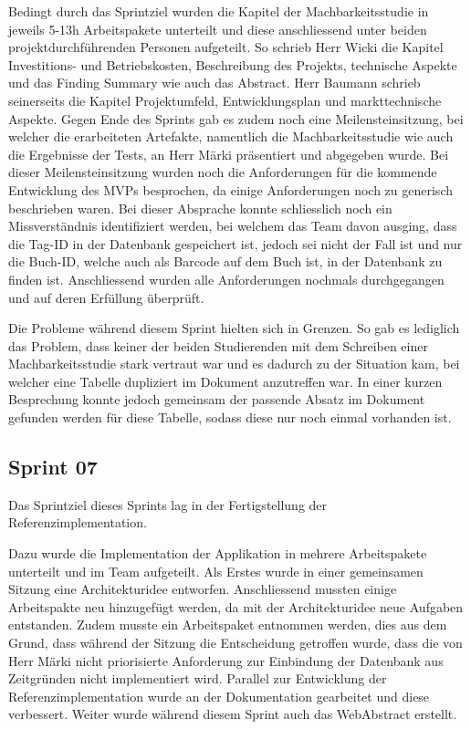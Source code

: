 Bedingt durch das Sprintziel wurden die Kapitel der Machbarkeitsstudie in jeweils 5-13h Arbeitspakete unterteilt und diese anschliessend unter beiden projektdurchführenden Personen aufgeteilt. So schrieb Herr Wicki die Kapitel Investitions- und Betriebskosten, Beschreibung des Projekts, technische Aspekte und das Finding Summary wie auch das Abstract. Herr Baumann schrieb seinerseits die Kapitel Projektumfeld, Entwicklungsplan und markttechnische Aspekte.
Gegen Ende des Sprints gab es zudem noch eine Meilensteinsitzung, bei welcher die erarbeiteten Artefakte, namentlich die Machbarkeitsstudie wie auch die Ergebnisse der Tests, an Herr Märki präsentiert und abgegeben wurde. Bei dieser Meilensteinsitzung wurden noch die Anforderungen für die kommende Entwicklung des MVPs besprochen, da einige Anforderungen noch zu generisch beschrieben waren. Bei dieser Absprache konnte schliesslich noch ein Missverständnis identifiziert werden, bei welchem das Team davon ausging, dass die Tag-ID in der Datenbank gespeichert ist, jedoch sei nicht der Fall ist und nur die Buch-ID, welche auch als Barcode auf dem Buch ist, in der Datenbank zu finden ist. Anschliessend wurden alle Anforderungen nochmals durchgegangen und auf deren Erfüllung überprüft.

Die Probleme während diesem Sprint hielten sich in Grenzen. So gab es lediglich das Problem, dass keiner der beiden Studierenden mit dem Schreiben einer Machbarkeitsstudie stark vertraut war und es dadurch zu der Situation kam, bei welcher eine Tabelle dupliziert im Dokument anzutreffen war. In einer kurzen Besprechung konnte jedoch gemeinsam der passende Absatz im Dokument gefunden werden für diese Tabelle, sodass diese nur noch einmal vorhanden ist.

\subsection{Sprint 07}
Das Sprintziel dieses Sprints lag in der Fertigstellung der Referenzimplementation.

 Dazu wurde die Implementation der Applikation in mehrere Arbeitspakete unterteilt und im Team aufgeteilt. Als Erstes wurde in einer gemeinsamen Sitzung eine Architekturidee entworfen. Anschliessend mussten einige Arbeitspakte neu hinzugefügt werden, da mit der Architekturidee neue Aufgaben entstanden. Zudem musste ein Arbeitspaket entnommen werden, dies aus dem Grund, dass während der Sitzung die Entscheidung getroffen wurde, dass die von Herr Märki nicht priorisierte Anforderung zur Einbindung der Datenbank aus Zeitgründen nicht implementiert wird. Parallel zur Entwicklung der Referenzimplementation wurde an der Dokumentation gearbeitet und diese verbessert. Weiter wurde während diesem Sprint auch das WebAbstract erstellt.

